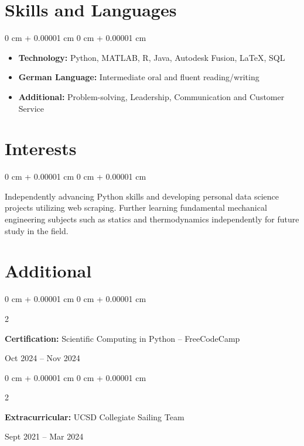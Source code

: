 \documentclass[10pt, letterpaper]{article}
\newenvironment{highlights}{
    \begin{itemize}[
        topsep=0.10 cm,
        parsep=0.10 cm,
        partopsep=0pt,
        itemsep=0pt,
        leftmargin=0 cm + 10pt
    ]
}{
    \end{itemize}
} %
\newenvironment{onecolentry}{
    \begin{adjustwidth}{
        0 cm + 0.00001 cm
    }{
        0 cm + 0.00001 cm
    }
}{
    \end{adjustwidth}
} %
\newenvironment{twocolentry}[2][]{
    \onecolentry
    \def\secondColumn{#2}
    \setcolumnwidth{\fill, 4.5 cm}
    \begin{paracol}{2}
}{
    \switchcolumn \raggedleft \secondColumn
    \end{paracol}
    \endonecolentry
} %
\begin{document}
    \section{Skills and Languages}



        
        \begin{onecolentry}
            \begin{highlights}
                \item  \textbf{Technology:} Python, MATLAB, R, Java, Autodesk Fusion, LaTeX, SQL
                
                \item \textbf{German Language:} Intermediate oral and fluent reading/writing
                \item \textbf{Additional: }Problem-solving, Leadership, Communication and Customer Service
            \end{highlights}
        \end{onecolentry}


    
    \section{Interests}

\begin{onecolentry}
    Independently advancing Python skills and developing personal data science projects utilizing web scraping. Further learning fundamental mechanical engineering subjects such as statics and thermodynamics independently for future study in the field. 
\end{onecolentry}

        
        


    
    \section{Additional}

   \begin{twocolentry}
        {Oct 2024 -- Nov 2024}
            \textbf{Certification:}  Scientific Computing in Python -- FreeCodeCamp
        \end{twocolentry}

        \vspace{0.2 cm}
        \begin{twocolentry}
            {Sept 2021 – Mar 2024}
            \textbf{Extracurricular:}
            UCSD Collegiate Sailing Team
        \end{twocolentry}    
\end{document}

